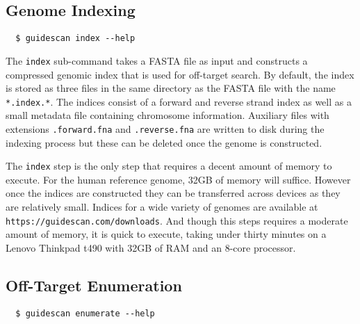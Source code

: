 \documentclass[11pt]{article}
\begin{document}
\subsection{Genome Indexing}

\begin{verbatim}
  $ guidescan index --help
\end{verbatim}

The \texttt{index} sub-command takes a FASTA file as input and
constructs a compressed genomic index that is used for off-target
search. By default, the index is stored as three files in the same
directory as the FASTA file with the name \texttt{*.index.*}. The
indices consist of a forward and reverse strand index as well as a
small metadata file containing chromosome information. Auxiliary files
with extensions \texttt{.forward.fna} and \texttt{.reverse.fna} are
written to disk during the indexing process but these can be deleted
once the genome is constructed.

The \texttt{index} step is the only step that requires a decent amount
of memory to execute. For the human reference genome, 32GB of memory
will suffice. However once the indices are constructed they can be
transferred across devices as they are relatively small. Indices for a
wide variety of genomes are available at
\texttt{https://guidescan.com/downloads}. And though this steps
requires a moderate amount of memory, it is quick to execute, taking
under thirty minutes on a Lenovo Thinkpad t490 with 32GB of RAM and an
8-core processor.

\subsection{Off-Target Enumeration}
\begin{verbatim}
  $ guidescan enumerate --help
\end{verbatim}
\end{document}
